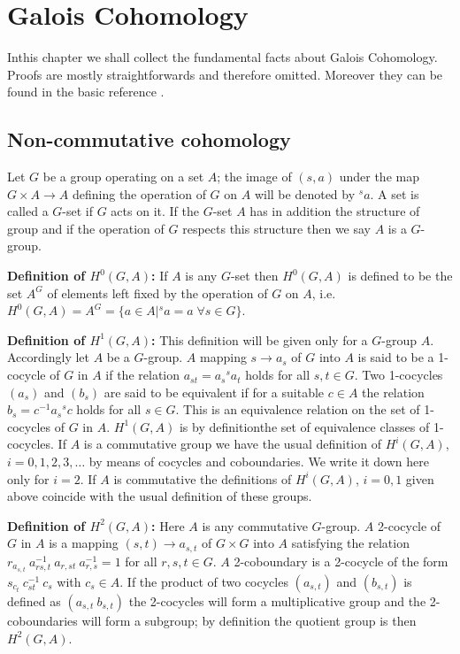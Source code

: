 

\chapter{Galois Cohomology}\label{chap1}%

In\pageoriginale this chapter we shall collect the fundamental facts
about Galois Cohomology. Proofs are mostly straightforwards and
therefore omitted. Moreover they can be found in the basic reference
\cite{keyS2}.  


\section{Non-commutative cohomology}\label{chap1:sec1.1}

Let $G$ be a group operating on a set $A$; the image of $(s,a)$ under
the map $G \times A \rightarrow A$ defining the operation of $G$ on
$A$ will be denoted by ${}^sa$. A set is called a $G$-set if $G$ acts on
it. If the $G$-set $A$ has in addition the structure of group and if
the operation of $G$ respects this structure then we say $A$ is a
$G$-group. 

\medskip
\noindent
\textbf{Definition of $H^0(G,A)$:} If $A$ is any $G$-set then
$H^0(G,A)$ is defined to be the set $A^G$ of elements left fixed by
the operation of $G$ on $A$, i.e. $H^0(G,A) = A^G = \{a\in A | {}^s a = a
\; \forall s \in G \}$. 

\medskip
\noindent
\textbf{Definition of $H^1(G,A)$:} This definition will be given only
for a $G$-group $A$. Accordingly let $A$ be a $G$-group. $A$ mapping
$s\rightarrow a_s$ of $G$ into $A$ is said to be a 1-cocycle of $G$
in $A$ if the relation $a_{st} = a_s {}^s a_t$ holds for all $s,t \in
G$. Two 1-cocycles $(a_s)$ and $(b_s)$ are said to be equivalent if
for a suitable $c\in A$ the relation $b_s = c^{-1}a_s {}^s c$ holds for
all $s\in G$. This is an equivalence relation on the set of
1-cocycles of $G$ in $A$. $H^1(G,A)$ is by definition\pageoriginale the set of
equivalence classes of 1-cocycles. If $A$ is a commutative group we
have the usual definition of $H^i(G,A)$, $i=0,1,2,3,\ldots$ by means of
cocycles and coboundaries. We write it down here only for $i = 2$. If $A$
is commutative the definitions of $H^i (G,A)$, $i=0,1$ given above
coincide with the usual definition of these groups.  

\medskip
\noindent
\textbf{Definition of $H^2(G,A)$:} Here $A$ is any commutative
$G$-group. $A$ 2-cocycle of $G$ in $A$ is a mapping
$(s,t)\rightarrow a_{s,t}$ of $G \times G$ into $A$ satisfying the
relation $r_{a_{s,t}} ~a^{-1}_{rs,t}~ a_{r,st} ~a^{-1}_{r,s} = 1$ for
all $r,s,t \in G$. $A$ 2-coboundary is a 2-cocycle of the form
$s_{c_t}~c^{-1}_{st}~c_s$ with $c_s \in A$. If the product of two
cocycles $(a_{s,t})$ and $(b_{s,t})$ is defined as $(a_{s,t}~b_{s,t})$
the 2-cocycles will form a multiplicative group and the
2-coboundaries will form a subgroup; by definition the quotient
group is then $H^2(G,A)$. 

